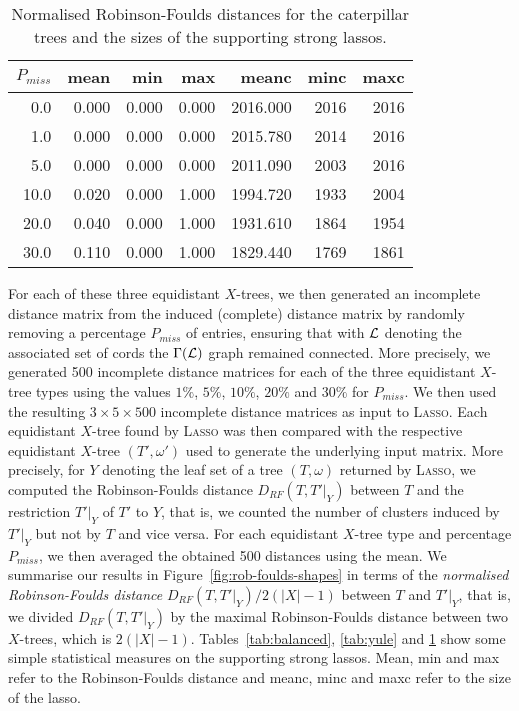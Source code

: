 \begin{table}
  \centering
  \begin{tabular}{rrrrrrr}
    \toprule
    $P_{miss}$ & mean    &  min    &  max   &  meanc  &   minc &   maxc\\
    \midrule
    0.0  &  0.000  &  0.000  &  0.000 & 2016.000  &   2016   &  2016\\
    1.0  &  0.000  &  0.000  &  0.000 & 2015.780  &   2014   &  2016\\
    5.0  &  0.000  &  0.000  &  0.000 & 2011.090  &   2003   &  2016\\
    10.0 &   0.020 &   0.000 &   1.000 & 1994.720 &   1933  &   2004\\
    20.0 &   0.040 &   0.000 &   1.000 &  1931.610 &   1864  &  1954\\
    30.0 &   0.110 &   0.000 &   1.000 &  1829.440 &   1769  &  1861\\
    \bottomrule
  \end{tabular}
  \caption{Normalised Robinson-Foulds distances for the
    caterpillar trees and the sizes of the supporting strong lassos.}
  \label{tab:caterpillar}
\end{table}

For each of these three equidistant $X$-trees, we then generated an incomplete
distance matrix from the induced (complete) distance matrix by randomly
removing a percentage $P_{miss}$ of entries, ensuring that with ${\mathcal L}$ denoting
the associated set of cords the $\Gamma({\mathcal L})$ graph remained connected. More
precisely, we generated 500 incomplete distance matrices for each of the three
equidistant $X$-tree types using the values $1\%$, $5\%$, $10\%$, $20\%$ and
$30\%$ for $P_{miss}$.  We then used the resulting $3 \times 5 \times 500$
incomplete distance matrices as input to \textsc{Lasso}. Each equidistant
$X$-tree found by \textsc{Lasso} was then compared with the respective
equidistant $X$-tree $(T',\omega')$ used to generate the underlying input
matrix. More precisely, for $Y$ denoting the leaf set of a tree $(T,\omega)$
returned by \textsc{Lasso}, we computed the Robinson-Foulds distance
\cite{robinson1981comparison} $D_{RF}(T,T'|_Y)$ between $T$ and the
restriction $T'|_Y$ of $T'$ to $Y$, that is, we counted the number of clusters
induced by $T'|_Y$ but not by $T$ and vice versa.  For each equidistant
$X$-tree type and percentage $P_{miss}$, we then averaged the obtained 500
distances using the mean. We summarise our results in
Figure~\ref{fig:rob-foulds-shapes} in terms of the {\em normalised
  Robinson-Foulds distance} $D_{RF}(T,T'|_Y)/2(|X|-1)$ between $T$ and
$T'|_Y$, that is, we divided $D_{RF}(T,T'|_Y)$ by the maximal Robinson-Foulds
distance between two $X$-trees, which is $2(|X|-1)$.
Tables~\ref{tab:balanced}, \ref{tab:yule} and \ref{tab:caterpillar} show some
simple statistical measures on the supporting strong lassos.  Mean, min and
max refer to the Robinson-Foulds distance and meanc, minc and maxc refer to
the size of the lasso.

